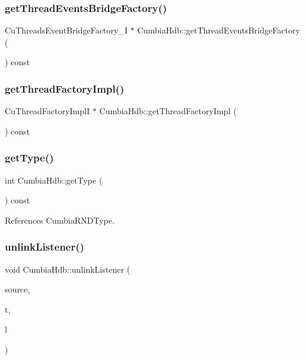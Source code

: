 \subsubsection{getThreadEventsBridgeFactory()}
{\footnotesize\ttfamily Cu\+Threads\+Event\+Bridge\+Factory\+\_\+I $\ast$ Cumbia\+Hdb\+::get\+Thread\+Events\+Bridge\+Factory (\begin{DoxyParamCaption}{ }\end{DoxyParamCaption}) const}

\mbox{\label{classCumbiaHdb_a12e07e9eb104d0c4257bef13db261e2d}} 
\subsubsection{getThreadFactoryImpl()}
{\footnotesize\ttfamily Cu\+Thread\+Factory\+ImplI $\ast$ Cumbia\+Hdb\+::get\+Thread\+Factory\+Impl (\begin{DoxyParamCaption}{ }\end{DoxyParamCaption}) const}

\mbox{\label{classCumbiaHdb_a2356a477d92a0591c10e445f9d13036a}} 
\subsubsection{getType()}
{\footnotesize\ttfamily int Cumbia\+Hdb\+::get\+Type (\begin{DoxyParamCaption}{ }\end{DoxyParamCaption}) const\hspace{0.3cm}{\ttfamily [virtual]}}



References Cumbia\+R\+N\+D\+Type.

\mbox{\label{classCumbiaHdb_a7a64a208a52fb799588390e55aac971e}} 
\subsubsection{unlinkListener()}
{\footnotesize\ttfamily void Cumbia\+Hdb\+::unlink\+Listener (\begin{DoxyParamCaption}\item[{const string \&}]{source,  }\item[{\textbf{ Cu\+R\+N\+D\+Action\+I\+::\+Type}}]{t,  }\item[{Cu\+Data\+Listener $\ast$}]{l }\end{DoxyParamCaption})}



